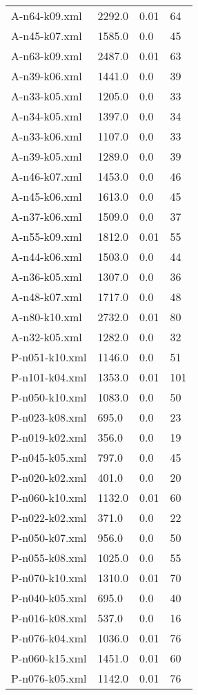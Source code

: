 \documentclass[12pt]{article}
\begin{document}
\begin{appendices}
\begin{table}[]
\begin{tabular}{llll}
	A-n64-k09.xml & 2292.0 & 0.01 & 64 \\
	A-n45-k07.xml & 1585.0 & 0.0 & 45 \\
	A-n63-k09.xml & 2487.0 & 0.01 & 63 \\
	A-n39-k06.xml & 1441.0 & 0.0 & 39 \\
	A-n33-k05.xml & 1205.0 & 0.0 & 33 \\
	A-n34-k05.xml & 1397.0 & 0.0 & 34 \\
	A-n33-k06.xml & 1107.0 & 0.0 & 33 \\
	A-n39-k05.xml & 1289.0 & 0.0 & 39 \\
	A-n46-k07.xml & 1453.0 & 0.0 & 46 \\
	A-n45-k06.xml & 1613.0 & 0.0 & 45 \\
	A-n37-k06.xml & 1509.0 & 0.0 & 37 \\
	A-n55-k09.xml & 1812.0 & 0.01 & 55 \\
	A-n44-k06.xml & 1503.0 & 0.0 & 44 \\
	A-n36-k05.xml & 1307.0 & 0.0 & 36 \\
	A-n48-k07.xml & 1717.0 & 0.0 & 48 \\
	A-n80-k10.xml & 2732.0 & 0.01 & 80 \\
	A-n32-k05.xml & 1282.0 & 0.0 & 32 \\
	P-n051-k10.xml & 1146.0 & 0.0 & 51 \\
	P-n101-k04.xml & 1353.0 & 0.01 & 101 \\
	P-n050-k10.xml & 1083.0 & 0.0 & 50 \\
	P-n023-k08.xml & 695.0 & 0.0 & 23 \\
	P-n019-k02.xml & 356.0 & 0.0 & 19 \\
	P-n045-k05.xml & 797.0 & 0.0 & 45 \\
	P-n020-k02.xml & 401.0 & 0.0 & 20 \\
	P-n060-k10.xml & 1132.0 & 0.01 & 60 \\
	P-n022-k02.xml & 371.0 & 0.0 & 22 \\
	P-n050-k07.xml & 956.0 & 0.0 & 50 \\
	P-n055-k08.xml & 1025.0 & 0.0 & 55 \\
	P-n070-k10.xml & 1310.0 & 0.01 & 70 \\
	P-n040-k05.xml & 695.0 & 0.0 & 40 \\
	P-n016-k08.xml & 537.0 & 0.0 & 16 \\
	P-n076-k04.xml & 1036.0 & 0.01 & 76 \\
	P-n060-k15.xml & 1451.0 & 0.01 & 60 \\
	P-n076-k05.xml & 1142.0 & 0.01 & 76 \\

\end{tabular}
\end{table}
\end{appendices}
\end{document}
